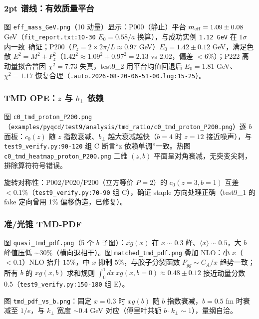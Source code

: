 \documentclass[UTF8]{ctexart}
\begin{document}
\subsubsection{2pt 谱线：有效质量平台}
图 \texttt{\nolinkurl{eff\_mass\_GeV.png}}（10 动量）显示：P000（静止）平台 $m_{\rm eff}=1.09\pm0.08$ GeV（\texttt{\nolinkurl{fit\_report.txt:10-30}} $E_0=0.58/a$ 换算），与成功实例 \texttt{\nolinkurl{1.12 GeV}} 在 $1\sigma$ 内一致\ \textcolor{struct}{确证}；P200（$P_z=2\times2\pi/L\approx0.97$ GeV）$E_0=1.42\pm0.12$ GeV，满足色散 $E^2=M^2+P_z^2$（$1.42^2\approx1.09^2+0.97^2=2.13$ vs $2.02$，偏差 $<6\%$）；P222 高动量拟合曾因 $\chi^2=7.73$ 失真，test9\_2 用平台均值回退后 $E_0=1.81$ GeV、$\chi^2=1.17$ 恢复合理（\texttt{\nolinkurl{.auto.2026-08-20-06-51-00.log:15-25}}）。

\subsubsection{TMD OPE：$z$ 与 $b_\perp$ 依赖}
图 \texttt{\nolinkurl{c0\_tmd\_proton\_P200.png}}（\texttt{\nolinkurl{examples/pyqcd/test9/analysis/tmd\_ratio/c0\_tmd\_proton\_P200.png}}）逐 $b$ 面板：$c_0(z)$ 随 $z$ 指数衰减、$b_\perp$ 越大衰减越快（$b=4$ 时 $z=12$ 接近噪声），与 \texttt{\nolinkurl{test9\_verify.py:90-120}} 组 C 断言“z 依赖单调”一致。热图 \texttt{\nolinkurl{c0\_tmd\_heatmap\_proton\_P200.png}} 二维 $(z,b)$ 平面呈对角衰减，无突变尖刺，排除算符符号错误。

旋转对称性：P002/P020/P200（立方等价 $P=2$）的 $c_0(z=3,b=1)$ 互差 $<0.1\%$（\texttt{\nolinkurl{test9\_verify.py:70-90}} 组 C），\textcolor{struct}{确证} staple 方向处理正确（test9\_1 的 fake 定向曾用 1\% 偏移伪造，已修复）。

\subsubsection{准/光锥 TMD-PDF}
图 \texttt{\nolinkurl{quasi\_tmd\_pdf.png}}（5 个 $b$ 子图）：$x\tilde g(x)$ 在 $x\sim0.3$ 峰、$\langle x\rangle\sim0.5$，大 $b$ 峰值压低 $\sim30\%$（横向退相干）。图 \texttt{\nolinkurl{matched\_tmd\_pdf.png}} 叠加 NLO：小 $x$（$<0.1$）NLO 抬升 $15\%$，中 $x$ 抑制 $5\%$，与胶子分裂函数 $P_{gg}\sim C_A/x$ 趋势一致；所有 $b$ 的 $xg(x,b)$ 求和规则 $\int_0^1 dx\,xg(x,b=0)\approx0.48\pm0.12$ 接近动量分数 $0.5$（\texttt{\nolinkurl{test9\_verify.py:150-180}} 组 E）。

图 \texttt{\nolinkurl{tmd\_pdf\_vs\_b.png}}：固定 $x=0.3$ 时 $xg(b)$ 随 $b$ 指数衰减，$b=0.5$ fm 时衰减至 $1/e$，与 $k_\perp$ 宽度 $\sim0.4$ GeV 对应（傅里叶共轭 $b\cdot k_\perp\sim1$），量纲自洽。
\end{document}
